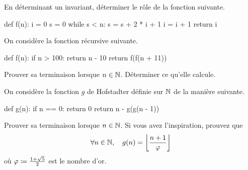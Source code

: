 \documentclass{magnoliaold}
\begin{document}


En déterminant un invariant, déterminer le rôle de la fonction suivante.
\begin{pythoncode}
def f(n):
    i = 0
    s = 0
    while s < n:
        s = s + 2 * i + 1
        i = i + 1
    return i
\end{pythoncode}



On considère la fonction récursive suivante.
\begin{pythoncode}
def f(n):
    if n > 100:
        return n - 10
    return f(f(n + 11))
\end{pythoncode}
\begin{questions}
\question Prouver sa terminaison lorsque $n\in\mathbb{N}$. 
\question Déterminer ce qu'elle calcule.
\end{questions}

On considère la fonction $g$ de Hofstadter définie sur $\mathbb{N}$ de la manière suivante. 
\begin{pythoncode}
def g(n):
    if n == 0:
        return 0
    return n - g(g(n - 1))
\end{pythoncode}
\begin{questions}
\question Prouver sa terminaison lorsque $n\in\mathbb{N}$. 
\question Si vous avez l'inspiration, prouvez que
  \[\forall n\in\mathbb{N},\quad g(n)=\left\lfloor\frac{n+1}{\varphi}\right\rfloor\]
	où $\varphi\coloneqq\frac{1+\sqrt{5}}{2}$ est le nombre d'or.
\end{questions}
\end{document}
